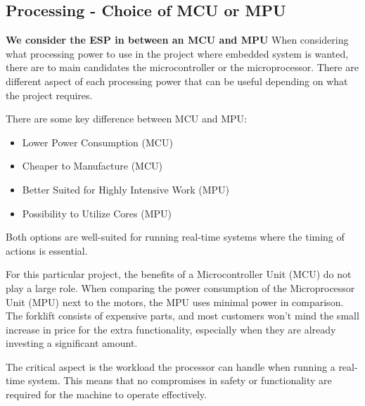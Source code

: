 \documentclass[../report.tex]{subfiles}
\begin{document}
\subsection{Processing - Choice of MCU or MPU}

    \textbf{We consider the ESP in between an MCU and MPU}
    When considering what processing power to use in the project where embedded
    system is wanted, there are to main candidates the microcontroller or the
    microprocessor. There are different aspect of each processing power that
    can be useful depending on what the project requires. 

    There are some key difference between MCU and MPU:
    \begin{itemize}
        \item Lower Power Consumption (MCU)
        \item Cheaper to Manufacture (MCU)
        \item Better Suited for Highly Intensive Work (MPU)
        \item Possibility to Utilize Cores (MPU)
    \end{itemize}

    Both options are well-suited for running real-time systems where the timing
    of actions is essential.

    For this particular project, the benefits of a Microcontroller Unit (MCU)
    do not play a large role. When comparing the power consumption of the
    Microprocessor Unit (MPU) next to the motors, the MPU uses minimal power in
    comparison. The forklift consists of expensive parts, and most customers
    won't mind the small increase in price for the extra functionality,
    especially when they are already investing a significant amount.
    
    The critical aspect is the workload the processor can handle when running a
    real-time system. This means that no compromises in safety or functionality
    are required for the machine to operate effectively.
\end{document}
